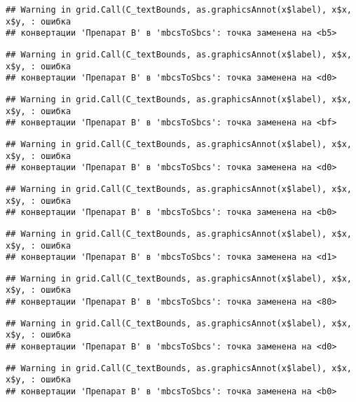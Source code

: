 \documentclass[
]{article}
\begin{document}
\begin{verbatim}
## Warning in grid.Call(C_textBounds, as.graphicsAnnot(x$label), x$x, x$y, : ошибка
## конвертации 'Препарат B' в 'mbcsToSbcs': точка заменена на <b5>
\end{verbatim}

\begin{verbatim}
## Warning in grid.Call(C_textBounds, as.graphicsAnnot(x$label), x$x, x$y, : ошибка
## конвертации 'Препарат B' в 'mbcsToSbcs': точка заменена на <d0>
\end{verbatim}

\begin{verbatim}
## Warning in grid.Call(C_textBounds, as.graphicsAnnot(x$label), x$x, x$y, : ошибка
## конвертации 'Препарат B' в 'mbcsToSbcs': точка заменена на <bf>
\end{verbatim}

\begin{verbatim}
## Warning in grid.Call(C_textBounds, as.graphicsAnnot(x$label), x$x, x$y, : ошибка
## конвертации 'Препарат B' в 'mbcsToSbcs': точка заменена на <d0>
\end{verbatim}

\begin{verbatim}
## Warning in grid.Call(C_textBounds, as.graphicsAnnot(x$label), x$x, x$y, : ошибка
## конвертации 'Препарат B' в 'mbcsToSbcs': точка заменена на <b0>
\end{verbatim}

\begin{verbatim}
## Warning in grid.Call(C_textBounds, as.graphicsAnnot(x$label), x$x, x$y, : ошибка
## конвертации 'Препарат B' в 'mbcsToSbcs': точка заменена на <d1>
\end{verbatim}

\begin{verbatim}
## Warning in grid.Call(C_textBounds, as.graphicsAnnot(x$label), x$x, x$y, : ошибка
## конвертации 'Препарат B' в 'mbcsToSbcs': точка заменена на <80>
\end{verbatim}

\begin{verbatim}
## Warning in grid.Call(C_textBounds, as.graphicsAnnot(x$label), x$x, x$y, : ошибка
## конвертации 'Препарат B' в 'mbcsToSbcs': точка заменена на <d0>
\end{verbatim}

\begin{verbatim}
## Warning in grid.Call(C_textBounds, as.graphicsAnnot(x$label), x$x, x$y, : ошибка
## конвертации 'Препарат B' в 'mbcsToSbcs': точка заменена на <b0>
\end{verbatim}
\end{document}
